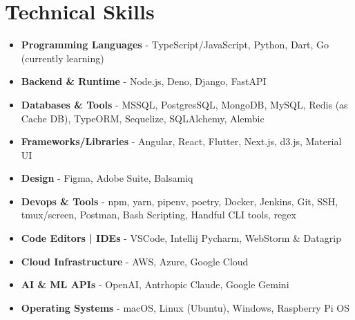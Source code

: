 \section{Technical Skills}
{
	\normalsize
	\begin{itemize}[topsep=0pt, partopsep=0pt, itemsep=0pt, parsep=0pt]
		\item \textbf{Programming Languages} - TypeScript/JavaScript, Python, Dart, Go (currently learning)
		\item \textbf{Backend \& Runtime} - Node.js, Deno, Django, FastAPI
		\item \textbf{Databases \& Tools} - MSSQL, PostgresSQL, MongoDB, MySQL, Redis (as Cache DB), TypeORM, Sequelize, SQLAlchemy, Alembic
		\item \textbf{Frameworks/Libraries} - Angular, React, Flutter, Next.js, d3.js, Material UI
		\item \textbf{Design} - Figma, Adobe Suite, Balsamiq
		\item \textbf{Devops \& Tools} - npm, yarn, pipenv, poetry, Docker, Jenkins, Git, SSH, tmux/screen, Postman, Bash Scripting, Handful CLI tools, regex
		\item \textbf{Code Editors | IDEs} - VSCode, Intellij Pycharm, WebStorm \& Datagrip
		\item \textbf{Cloud Infrastructure} - AWS, Azure, Google Cloud
		\item \textbf{AI \& ML APIs} - OpenAI, Antrhopic Claude, Google Gemini
		\item \textbf{Operating Systems} - macOS, Linux (Ubuntu), Windows, Raspberry Pi OS
	\end{itemize}
}